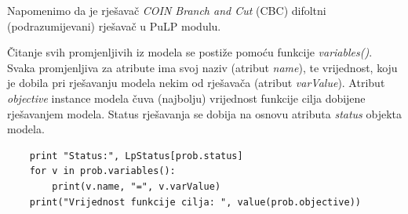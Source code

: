 \documentclass[a4paper, utf8, 11pt, colorlinks]{book}
\theoremstyle{definition}
\begin{document}
 Napomenimo da je rješavač \emph{COIN Branch and Cut} (CBC) difoltni (podrazumijevani)  rješavač u PuLP modulu. 
 
 
 
 Čitanje svih promjenljivih iz modela se postiže pomoću funkcije \emph{variables()}. Svaka promjenljiva za atribute ima svoj naziv (atribut \emph{name}), te vrijednost, koju je dobila pri rješavanju modela nekim od rješavača (atribut \emph{varValue}). Atribut \emph{objective} instance modela čuva (najbolju) vrijednost funkcije cilja dobijene rješavanjem modela. Status rješavanja se dobija na osnovu atributa \emph{status} objekta modela. 
 
 \begin{verbatim}
 	print "Status:", LpStatus[prob.status]
 	for v in prob.variables():
 	    print(v.name, "=", v.varValue)
 	print("Vrijednost funkcije cilja: ", value(prob.objective))
  
 \end{verbatim}
\end{document}
